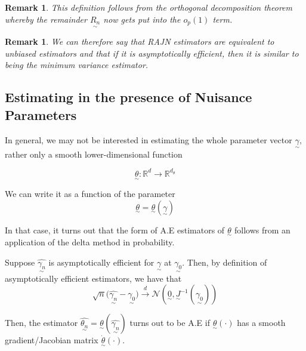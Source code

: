 \documentclass[twoside]{article}
\newtheorem{remark}[theorem]{Remark}
\newcommand{\real}{\mathbb{R}}
\newcommand{\utilde}{\underset{\sim}}
\begin{document}
\begin{remark} This definition follows from the orthogonal decomposition theorem whereby the remainder $\utilde{R_{n}}$ now gets put into the $o_p(1)$ term.
\end{remark}

\begin{remark} We can therefore say that RAJN estimators are equivalent to unbiased estimators and that if it is asymptotically efficient, then it is similar to being the minimum variance estimator.
\end{remark}

\subsection{Estimating in the presence of Nuisance Parameters}

In general, we may not be interested in estimating the whole parameter vector $\utilde{\gamma},$ rather only a smooth lower-dimensional function 

$$
\utilde{\theta}: \real^{d} \rightarrow \real^{d_{\theta}}
$$

We can write it as a function of the parameter 
$$
\utilde{\theta} = \utilde{\theta}(\utilde{\gamma})
$$

In that case, it turns out that the form of A.E estimators of $\utilde{\theta}$ follows from an application of the delta method in probability.

Suppose $\hat{\utilde{\gamma_{n}}}$ is asymptotically efficient for $\utilde{\gamma}$ at $\utilde{\gamma_{0}}$. Then, by definition of asymptotically efficient estimators, we have that
$$
\sqrt{n}\bigg(\hat{\utilde{\gamma_{n}}} - \utilde{\gamma_{0}} \bigg) \xrightarrow{d} \mathcal{N}(\utilde{0}, \utilde{J}^{-1}(\utilde{\gamma_{0}}))
$$

Then, the estimator $\hat{\utilde{\theta_{n}}} = \utilde{\theta}(\hat{\utilde{\gamma_{n}}})$ turns out to be A.E if $\utilde{\theta}(\cdot)$ has a smooth gradient/Jacobian matrix $\dot{\utilde{\theta}}(\cdot)$.
\end{document}
